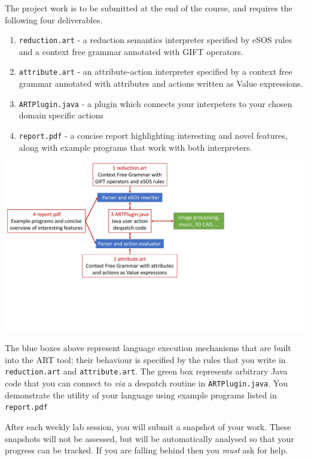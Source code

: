 \documentclass[11pt]{book}
\begin{document}
The project work is to be submitted at the end of the course, and requires the following four deliverables.
\begin{enumerate}
\item {\tt reduction.art} - a reduction semantics interpreter specified by eSOS rules and a context free grammar annotated with GIFT operators.
\item {\tt attribute.art} - an attribute-action interpreter specified by a context free grammar annotated with attributes and actions written as Value expressions.
\item {\tt ARTPlugin.java} - a plugin which connects your interpeters to your chosen domain specific actions
\item {\tt report.pdf} - a concise report highlighting interesting and novel features, along with example programs that work with both interpreters.
\end{enumerate}

\includegraphics[scale=0.5,trim={0.25cm 5.8cm 9cm 0},clip]{project.pdf}

The blue boxes above represent language execution mechanisms that are built into the ART tool; their behaviour is specified by the rules that you write in {\tt reduction.art} and {\tt attribute.art}. The green box represents arbitrary Java code that you can connect to {\em via} a despatch routine in {\tt ARTPlugin.java}. You demonstrate the utility of your language using example programs listed in {\tt report.pdf}

After each weekly lab session, you will submit a snapshot of your work. These snapshots will not be assessed, but will be automatically analysed so that your progress can be tracked. If you are falling behind then you {\em must} ask for help.
\end{document}
